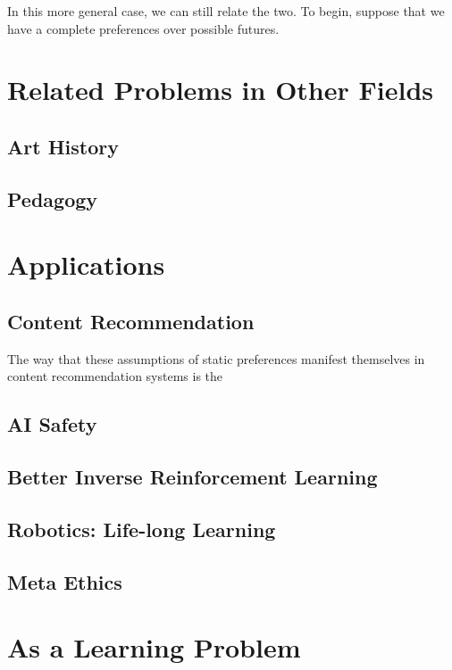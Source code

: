 \documentclass{book}
\begin{document}
	In this more general case, we can still relate the two. To begin, suppose that we have a complete preferences over possible futures. 
	
	
	\section{Related Problems in Other Fields}
	
	\subsection{Art History} %
	\subsection{Pedagogy} %
	\subsection{}
	
	
	\section{Applications}
	
	\subsection{Content Recommendation}
	The way that these assumptions of static preferences manifest themselves in content recommendation systems is the
	
	\subsection{AI Safety}
	\subsection{Better Inverse Reinforcement Learning}
	\subsection{Robotics: Life-long Learning}
	\subsection{Meta Ethics}
	
	\section{As a Learning Problem}
	
	\nocite{*}
	\printbibliography
	
	
\end{document}
